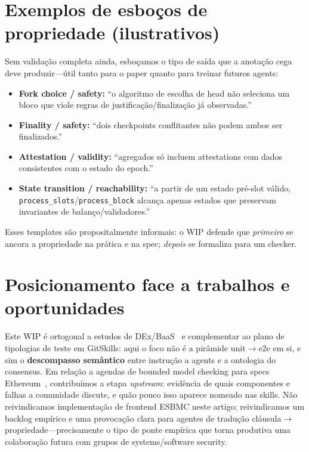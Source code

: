 \documentclass[10pt,conference]{IEEEtran}
\begin{document}
\section{Exemplos de esboços de propriedade (ilustrativos)}

Sem validação completa ainda, esboçamos o tipo de saída que a anotação cega deve produzir---útil tanto para o paper quanto para treinar futuros agents:

\begin{itemize}
\item \textbf{Fork choice / safety:} ``o algoritmo de escolha de head não seleciona um bloco que viole regras de justificação/finalização já observadas.''
\item \textbf{Finality / safety:} ``dois checkpoints conflitantes não podem ambos ser finalizados.''
\item \textbf{Attestation / validity:} ``agregados só incluem attestations com dados consistentes com o estado do epoch.''
\item \textbf{State transition / reachability:} ``a partir de um estado pré-slot válido, \texttt{process\_slots}/\texttt{process\_block} alcança apenas estados que preservam invariantes de balanço/validadores.''
\end{itemize}

Esses templates são propositalmente informais: o WIP defende que \emph{primeiro} se ancora a propriedade na prática e na spec; \emph{depois} se formaliza para um checker.

\section{Posicionamento face a trabalhos e oportunidades}

Este WIP é ortogonal a estudos de DEx/BaaS~\cite{soares2025bcdex} e complementar ao plano de tipologias de teste em GitSkills: aqui o foco não é a pirâmide unit$\rightarrow$e2e em si, e sim o \textbf{descompasso semântico} entre instrução a agents e a ontologia do consensus. Em relação a agendas de bounded model checking para specs Ethereum~\cite{clarke2018bmc,consensusSpecs}, contribuímos a etapa \emph{upstream}: evidência de quais componentes e falhas a comunidade discute, e quão pouco isso aparece nomeado nas skills. Não reivindicamos implementação de frontend ESBMC neste artigo; reivindicamos um backlog empírico e uma provocação clara para agentes de tradução cláusula$\rightarrow$propriedade---precisamente o tipo de ponte empírica que torna produtiva uma colaboração futura com grupos de systems/software security.
\end{document}
